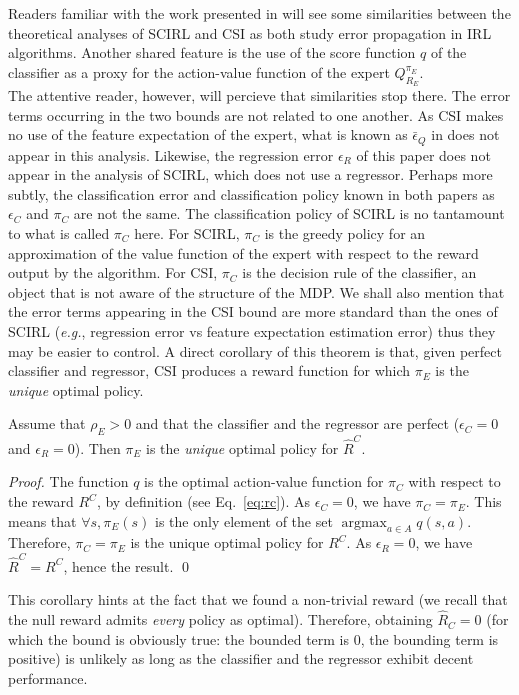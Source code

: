 \documentclass[smallextended]{svjour3}
\newcommand{\argmax}{\operatorname*{argmax}} %
\begin{document}
Readers familiar with the work presented in \cite{klein2012scirl} will see some similarities between the theoretical analyses of SCIRL and CSI as both study error propagation in IRL algorithms. Another shared feature is the use of the score function $q$ of the classifier as a proxy for the action-value function of the expert $Q^{\pi_E}_{R_E}$. \\
The attentive reader, however, will percieve that similarities stop there. The error terms occurring in the two bounds are not related to one another. As CSI makes no use of the feature expectation of the expert, what is known as $\bar\epsilon_Q$ in \cite{klein2012scirl} does not appear in this analysis. Likewise, the regression error $\epsilon_R$ of this paper does not appear in the analysis of SCIRL, which does not use a regressor. Perhaps more subtly, the classification error and classification policy known in both papers as $\epsilon_C$ and $\pi_C$ are not the same. The classification policy of SCIRL is no tantamount to what is called $\pi_C$ here. For SCIRL, $\pi_C$ is the greedy policy for an approximation of the value function of the expert with respect to the reward output by the algorithm. For CSI, $\pi_C$ is the decision rule of the classifier, an object that is not aware of the structure of the MDP. We shall also mention that the error terms appearing in the CSI bound are more standard than the ones of SCIRL ({\it e.g.}, regression error vs feature expectation estimation error) thus they may be easier to control.
A direct corollary of this theorem is that, given perfect classifier and regressor, CSI produces a reward function for which $\pi_E$ is the \emph{unique} optimal policy.
\begin{corollary}
  \label{cor}
  Assume that $\rho_E>0$ and that the classifier and the regressor are perfect ($\epsilon_C = 0$ and $\epsilon_R = 0$). Then $\pi_E$ is the \emph{unique} optimal policy for $\hat R^C$.
\end{corollary}
\begin{proof}

  The function $q$ is the optimal action-value function for $\pi_C$ with respect to the reward $R^C$, by definition (see Eq.~\eqref{eq:rc}).
  As $\epsilon_C = 0$, we have $\pi_C = \pi_E$. This means that $\forall s, \pi_E(s)$ is the only element of the set $\argmax_{a\in A}q(s,a)$. Therefore, $\pi_C = \pi_E$ is the unique optimal policy for $R^C$.
  As $\epsilon_R = 0$, we have $\hat R^C = R^C$, hence the result.
  \qed
\end{proof}
This corollary hints at the fact that we found a non-trivial reward (we recall that the null reward admits \emph{every} policy as optimal). Therefore, obtaining  $\hat{R}_C = 0$ (for which the bound is obviously true: the bounded term is $0$, the bounding term is positive) is unlikely as long as the classifier and the regressor exhibit decent performance.
\end{document}

